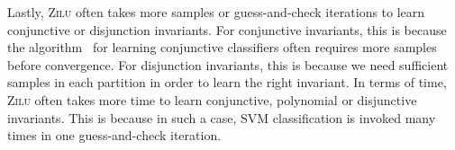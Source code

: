 Lastly, \textsc{Zilu} often takes more samples or guess-and-check iterations to learn conjunctive or disjunction invariants. For conjunctive invariants, this is because the algorithm~\cite{sharma2012interpolants} for learning conjunctive classifiers often requires more samples before convergence. For disjunction invariants, this is because we need sufficient samples in each partition in order to learn the right invariant. In terms of time, \textsc{Zilu} often takes more time to learn conjunctive, polynomial or disjunctive invariants. This is because in such a case, SVM classification is invoked many times in one guess-and-check iteration.



